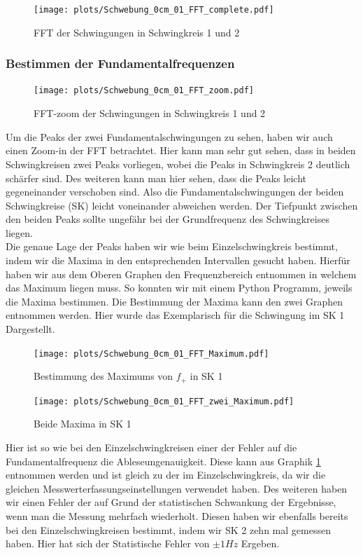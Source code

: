 \documentclass[twoside]{protokoll}
\begin{document}
\begin{figure}[H]
    \centering
    \texttt{[image: plots/Schwebung\_0cm\_01\_FFT\_complete.pdf]}
    \caption{FFT der Schwingungen in Schwingkreis 1 und 2}
\end{figure}

\subsubsection{Bestimmen der Fundamentalfrequenzen}

\begin{figure}[H]
    \centering
    \texttt{[image: plots/Schwebung\_0cm\_01\_FFT\_zoom.pdf]}
    \caption{FFT-zoom der Schwingungen in Schwingkreis 1 und 2}
\end{figure}

Um die Peaks der zwei Fundamentalschwingungen zu sehen, haben wir auch einen Zoom-in der FFT betrachtet. 
Hier kann man sehr gut sehen, dass in beiden Schwingkreisen zwei Peaks vorliegen, wobei die Peaks in Schwingkreis 2 deutlich schärfer sind. 
Des weiteren kann man hier sehen, dass die Peaks leicht gegeneinander verschoben sind. Also die Fundamentalschwingungen der beiden Schwingkreise (SK) leicht voneinander abweichen werden.
Der Tiefpunkt zwischen den beiden Peaks sollte ungefähr bei der Grundfrequenz des Schwingkreises liegen.\\


Die genaue Lage der Peaks haben wir wie beim Einzelschwingkreis bestimmt, indem wir die Maxima in den entsprechenden Intervallen gesucht haben.
Hierfür haben wir aus dem Oberen Graphen den Frequenzbereich entnommen in welchem das Maximum liegen muss. So konnten wir mit einem Python Programm, jeweils die Maxima bestimmen.
Die Bestimmung der Maxima kann den zwei Graphen entnommen werden. Hier wurde das Exemplarisch für die Schwingung im SK 1 Dargestellt.

\begin{figure}[H]
    \centering
    \texttt{[image: plots/Schwebung\_0cm\_01\_FFT\_Maximum.pdf]}
    \caption{Bestimmung des Maximums von $f_+$ in SK 1}
    \label{Schwebung_Maxima}
\end{figure}


\begin{figure}[H]
    \centering
    \texttt{[image: plots/Schwebung\_0cm\_01\_FFT\_zwei\_Maximum.pdf]}
    \caption{Beide Maxima in SK 1}
\end{figure}

Hier ist so wie bei den Einzelschwingkreisen einer der Fehler auf die Fundamentalfrequenz die Ableseungenauigkeit. Diese kann aus Graphik \ref{Schwebung_Maxima} entnommen werden und ist gleich zu der im Einzelschwingkreis, da wir die gleichen Messwerterfassungseinstellungen verwendet haben.
Des weiteren haben wir einen Fehler der auf Grund der statistischen Schwankung der Ergebnisse, wenn man die Messung mehrfach wiederholt. 
Diesen haben wir ebenfalls bereits bei den Einzelschwingkreisen bestimmt, indem wir SK 2 zehn mal gemessen haben. 
Hier hat sich der Statistische Fehler von $\pm 1Hz$ Ergeben.\\
\end{document}

